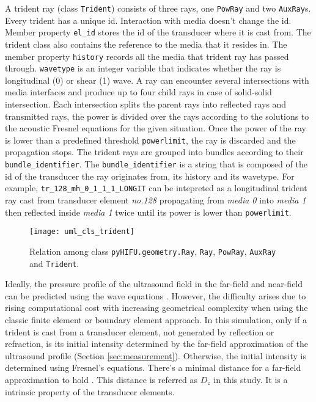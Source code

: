 A trident ray (class \texttt{Trident}) consists of three rays, one \texttt{PowRay} and two \texttt{AuxRay}s. Every trident has a unique id. Interaction with media doesn't change the id. Member property \texttt{el\_id} stores the id of the transducer where it is cast from. The trident class also contains the reference to the media that it resides in. The member property \texttt{history} records all the media that trident ray has passed through. \texttt{wavetype} is an integer variable that indicates whether the ray is longitudinal (0) or shear (1) wave. A ray can encounter several intersections with media interfaces and produce up to four child rays in case of solid-solid intersection. Each intersection splits the parent rays into reflected rays and transmitted rays, the power is divided over the rays according to the solutions to the acoustic Fresnel equations for the given situation. Once the power of the ray is lower than a predefined threshold \texttt{powerlimit}, the ray is discarded and the propagation stops.
The trident rays are grouped into bundles according to their \texttt{bundle\_identifier}. The \texttt{bundle\_identifier} is a string that is composed of the id of the transducer the ray originates from, its history and its wavetype. For example, \texttt{tr\_128\_mh\_0\_1\_1\_1\_LONGIT} can be intepreted as a longitudinal trident ray cast from transducer element \textit{no.128} propagating from \textit{media 0} into \textit{media 1} then reflected inside  \textit{media 1} twice until its power is lower than \texttt{powerlimit}.

\begin{figure}[h]
    \centering
    \texttt{[image: uml\_cls\_trident]}
    \caption{Relation among class \texttt{pyHIFU.geometry.Ray}, \texttt{Ray}, \texttt{PowRay}, \texttt{AuxRay}  and  \texttt{Trident}.}
    \label{fig:uml_cls_trident}
\end{figure}

Ideally, the pressure profile of the ultrasound field in the far-field and near-field can be predicted using the wave equations \cite{vanwijk2013}. However, the difficulty arises due to rising computational cost with increasing geometrical complexity when using the classic finite element or boundary element approach. In this simulation, only if a trident is cast from a transducer element, not generated by reflection or refraction, is its initial intensity determined by the far-field approximation of the ultrasound profile (Section \ref{sec:measurement}). Otherwise, the initial intensity is determined using Fresnel's equations. There's a minimal distance for a far-field approximation to hold \cite{auld1973acoustic}. This distance is referred as $D_z$ in this study. It is a intrinsic property of the transducer elements.

